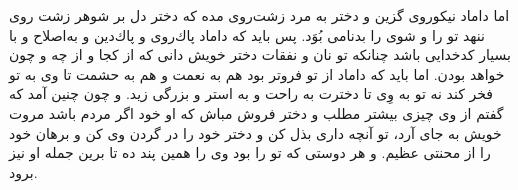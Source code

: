 اما داماد نيكو‌روى گزين و دختر به مرد زشت‌روى مده كه دختر دل بر شوهر زشت روى ننهد تو را و شوى را بدنامى بُوَد. پس بايد كه داماد پاك‌روى و پاك‌دين و به‌اصلاح و با بسيار كدخدايى باشد چنانكه تو نان و نفقات دختر خويش دانى كه از كجا و از چه و چون خواهد بودن. اما بايد كه داماد از تو فروتر بود هم به نعمت و هم به حشمت تا وى به تو فخر كند نه تو به وِى تا دخترت به راحت و به استر و بزرگى زيد. و چون چنين آمد كه گفتم از وى چيزى بيشتر مطلب و دختر فروش مباش كه او خود اگر مردم باشد مروت خويش به جاى آرد، تو آنچه دارى بذل كن و دختر خود را در گردن وى كن و برهان خود را از محنتى عظيم. و هر دوستى كه تو را بود وى را همين پند ده تا برين جمله او نيز برود.
\newpage

